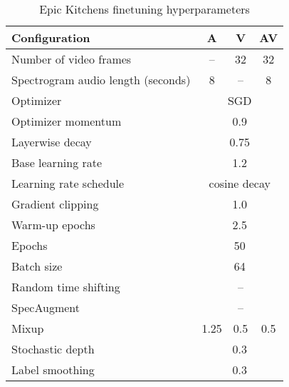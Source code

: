 \documentclass[10pt,twocolumn,letterpaper]{article}
\begin{document}
\begin{table}[th] 
	\caption{Epic Kitchens finetuning hyperparameters}
	\vspace{-0.6\baselineskip}
	\centering
		\begin{tabular}{lccc}
			\toprule 
			Configuration        & A  & V & AV \\
			\midrule
			Number of video frames     & -- & 32 & 32\\
			Spectrogram audio length (seconds)    & 8 & -- & 8  \\
			\midrule
			Optimizer              &  \multicolumn{3}{c}{SGD}   \\
			Optimizer momentum        &   \multicolumn{3}{c}{0.9} \\
			Layerwise decay~\cite{bao2021beit, clark2020electra}    &  \multicolumn{3}{c}{0.75}  \\
			Base learning rate          &  \multicolumn{3}{c}{1.2} \\
			Learning rate schedule     &  \multicolumn{3}{c}{cosine decay} \\
			Gradient clipping        &   \multicolumn{3}{c}{1.0}  \\  
			Warm-up epochs          &   \multicolumn{3}{c}{2.5} \\
			Epochs                 &   \multicolumn{3}{c}{50} \\
			Batch size             &   \multicolumn{3}{c}{64} \\
			\midrule 
			Random time shifting     & \checkmark     & --    &  \checkmark  \\
		    SpecAugment \cite{park2019specaugment}   & \checkmark  & -- & \checkmark \\
			Mixup  \cite{zhang_mixup_iclr_2018}           & 1.25 & 0.5 & 0.5 \\
			Stochastic depth  \cite{huang_stochasticdepth_eccv_2016}    &  \multicolumn{3}{c}{0.3} \\
			Label smoothing  \cite{szegedy_cvpr_2016}          &  \multicolumn{3}{c}{0.3} \\
			\bottomrule
		\end{tabular}
		\label{tab:hyperparams_epic_kitchens}
\end{table}
\end{document}

